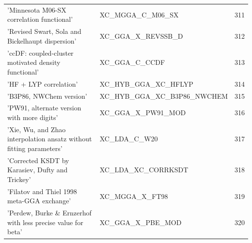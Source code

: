 \documentclass[final,12pt,makeidx,DIV=calc]{article}
\begin{document}
{{{\begin{table}[!h]
\begin{center}
\begin{tabular}{llr}
  'Minnesota M06-SX correlation functional' & XC\_MGGA\_C\_M06\_SX  &311\\
  'Revised Swart, Sola and Bickelhaupt dispersion' & XC\_GGA\_X\_REVSSB\_D  &312\\
  'ccDF: coupled-cluster motivated density functional' & XC\_GGA\_C\_CCDF  &313\\
  'HF + LYP correlation' & XC\_HYB\_GGA\_XC\_HFLYP  &314\\
  'B3P86, NWChem version' & XC\_HYB\_GGA\_XC\_B3P86\_NWCHEM  &315\\
  'PW91, alternate version with more digits' & XC\_GGA\_X\_PW91\_MOD  &316\\
  'Xie, Wu, and Zhao interpolation ansatz without fitting parameters' & XC\_LDA\_C\_W20  &317\\
  'Corrected KSDT by Karasiev, Dufty and Trickey' & XC\_LDA\_XC\_CORRKSDT  &318\\
  'Filatov and Thiel 1998 meta-GGA exchange' & XC\_MGGA\_X\_FT98  &319\\
  'Perdew, Burke \& Ernzerhof with less precise value for beta' & XC\_GGA\_X\_PBE\_MOD  &320\\
\hline
\hline
\end{tabular}
\end{center}
\end{table}

}}}
\end{document}
